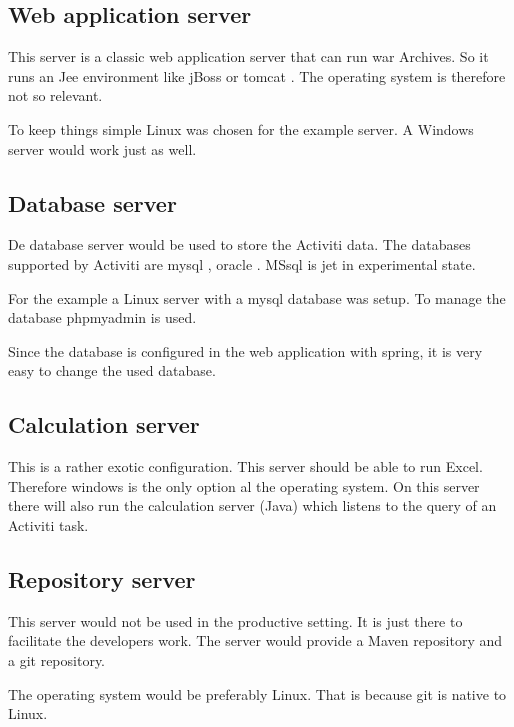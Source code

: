 \documentclass[paper=a4,twoside=false,BCOR=0mm,DIV=calc,fontsize=12pt]{scrartcl}
\begin{document}
\subsection{Web application server}
This server is a classic web application server that can run war Archives. 
So it runs an Jee environment like jBoss \cite{jboss} or tomcat \cite{tomcat}.
The operating system is therefore not so relevant. 

To keep things simple Linux was chosen for the example server. A Windows server would work just as well.



\subsection{Database server}
De database server would be used to store the Activiti data. The databases supported by Activiti are mysql \cite{mysql}, oracle \cite{oracledb}. MSsql \cite{mssql} is jet in experimental state.
 
For the example a Linux server with a mysql database was setup.
To manage the database phpmyadmin \cite{phpmyadmin} is used.

Since the database is configured in the web application with spring, it is very easy to change the used database.


\subsection{Calculation server}
This is a rather exotic configuration. This server should be able to run Excel. Therefore windows is the only option al the operating system. On this server there will also run the calculation server (Java) which listens to the query of an Activiti task.



\subsection{Repository server}
This server would not be used in the productive setting. It is just there to facilitate the developers work.
The server would provide a Maven repository and a git repository. 

The operating system would be preferably Linux. That is because git is native to Linux.
\end{document}
